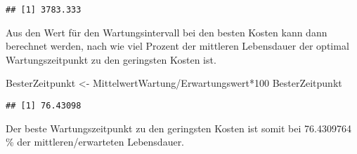 \documentclass[
]{article}
\newenvironment{Shaded}{\begin{snugshade}}{\end{snugshade}}
\newcommand{\DecValTok}[1]{\textcolor[rgb]{0.00,0.00,0.81}{#1}}
\newcommand{\NormalTok}[1]{#1}
\newcommand{\OtherTok}[1]{\textcolor[rgb]{0.56,0.35,0.01}{#1}}
\newcommand{\SpecialCharTok}[1]{\textcolor[rgb]{0.00,0.00,0.00}{#1}}
\begin{document}
\begin{verbatim}
## [1] 3783.333
\end{verbatim}

Aus den Wert für den Wartungsintervall bei den besten Kosten kann dann
berechnet werden, nach wie viel Prozent der mittleren Lebensdauer der
optimal Wartungszeitpunkt zu den geringsten Kosten ist.

\begin{Shaded}
\begin{Highlighting}[]
\NormalTok{BesterZeitpunkt }\OtherTok{\textless{}{-}}\NormalTok{ MittelwertWartung}\SpecialCharTok{/}\NormalTok{Erwartungswert}\SpecialCharTok{*}\DecValTok{100}
\NormalTok{BesterZeitpunkt}
\end{Highlighting}
\end{Shaded}

\begin{verbatim}
## [1] 76.43098
\end{verbatim}

Der beste Wartungszeitpunkt zu den geringsten Kosten ist somit bei
76.4309764 \% der mittleren/erwarteten Lebensdauer.
\end{document}
